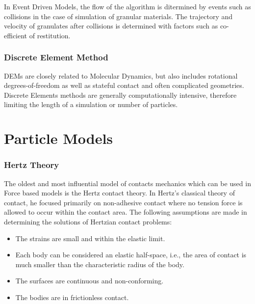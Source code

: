 In Event Driven Models, the flow of the algorithm is ditermined by events such as collisions in the case of simulation of granular materials. The trajectory and velocity of granulates after collisions is determined with factors such as co-efficient of restitution.  

\subsubsection{Discrete Element Method}

DEMs are closely related to Molecular Dynamics, but also includes rotational degrees-of-freedom as well as stateful contact and often complicated geometries. Discrete Elements methods are generally computationally intensive, therefore limiting the length of a simulation or number of particles.

\section{Particle Models}

\subsubsection{Hertz Theory \citep{landau}}

The oldest and most influential model of contacts mechanics which can be used in Force based models is the Hertz contact theory. In Hertz’s classical theory of contact, he focused primarily on non-adhesive contact where no tension force is allowed to occur within the contact area. The following assumptions are made in determining the solutions of Hertzian contact problems:

\begin{itemize}
\item The strains are small and within the elastic limit.
\item Each body can be considered an elastic half-space, i.e., the area of contact is much smaller than the characteristic radius of the body.
\item The surfaces are continuous and non-conforming.
\item The bodies are in frictionless contact.
\end{itemize}


